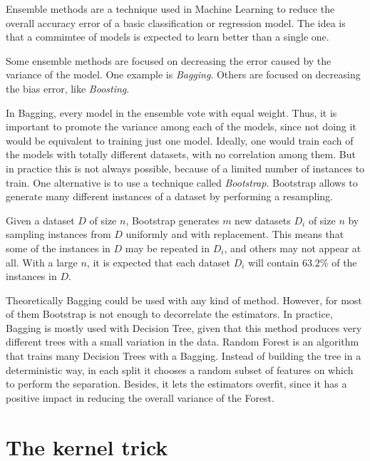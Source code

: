   \begin{pre-delivery}
    Ensemble methods\cite{polikar2006ensemble} are a technique used in Machine
    Learning to reduce the
    overall accuracy error of a basic classification or regression model. The
    idea is that a commimtee of models is expected to learn better than a single
    one.

    Some ensemble methods are focused on decreasing the error caused by the
    variance of the model. One example is \textit{Bagging}\cite{breiman1996bagging}. Others are focused
    on decreasing the bias error, like \textit{Boosting}\cite{freund1997decision}.

    In Bagging, every model in the ensemble vote with equal weight. Thus, it is
    important to promote the variance among each of the models, since not doing
    it would be equivalent to training just one model. Ideally, one would train
    each of the models with totally different datasets, with no correlation
    among them. But in practice this is not always possible, because of a
    limited number of instances to train. One alternative is to use a
    technique called \textit{Bootstrap}\cite{efron1994introduction}. Bootstrap allows to generate
    many different instances of a dataset by performing a resampling.

    Given a dataset $D$ of size $n$, Bootstrap generates $m$ new datasets
    $D_i$ of size $n$ by sampling instances from $D$ uniformly and with
    replacement. This means that some of the instances in $D$ may be repeated
    in $D_i$, and others may not appear at all. With a large $n$, it is expected
    that each dataset $D_i$ will contain $63.2 \% $ of the instances in $D$.

    Theoretically Bagging could be used with any kind of method. However, for
    most of them Bootstrap is not enough to decorrelate the estimators.
    In practice, Bagging is mostly used with Decision Tree, given that this
    method produces very different trees with a small variation in the data.
    Random Forest\cite{Breiman2001} is an algorithm that trains many Decision Trees with a
    Bagging. Instead of building the tree in a deterministic way, in each
    split it chooses a random subset of features on which to perform the
    separation. Besides, it lets the estimators overfit, since it has a positive
    impact in reducing the overall variance of the Forest.
  \end{pre-delivery}

\section{The kernel trick}
\label{sec:kern-trick}




